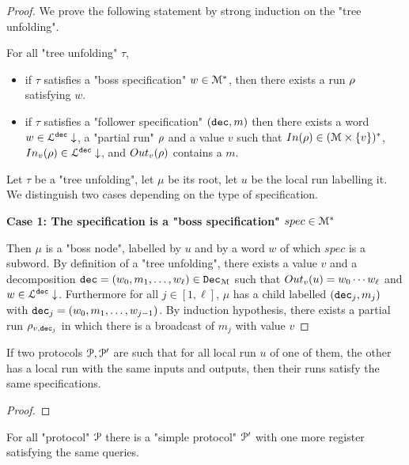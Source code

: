 \begin{proof}
	We prove the following statement by strong induction on the "tree unfolding". 
	
	For all "tree unfolding" $\tau$, 
	
	\begin{itemize}
		\item if $\tau$ satisfies a "boss specification" $w \in \mathcal{M}^*$, then there exists a run $\rho$ satisfying $w$.
		
		\item if $\tau$ satisfies a "follower specification" $(\mathtt{dec}, m)$ then there exists a word $w \in \mathcal{L}^{\mathtt{\mathtt{dec}}}\downarrow$, a "partial run" $\rho$ and a value $v$ such that $In(\rho) \in (\mathcal{M}\times \{v\})^*$, $In_{v}(\rho) \in \mathcal{L}^{\mathtt{\mathtt{dec}}}\downarrow$, and $Out_{v}(\rho)$ contains a $m$.
	\end{itemize}
	
	Let $\tau$ be a "tree unfolding", let $\mu$ be its root, let $u$ be the local run labelling it. 
	We distinguish two cases depending on the type of specification.
	
	\textbf{Case 1: The specification is a "boss specification" $spec \in \mathcal{M}^*$}
	
	Then $\mu$ is a "boss node", labelled by $u$ and by a word $w$ of which $spec$ is a subword. 
	By definition of a "tree unfolding", there exists a value $v$ and a decomposition $\mathtt{dec} = (w_0, m_1, \ldots, w_\ell) \in \mathtt{Dec}_{\mathcal{M}}$ such that $Out_{v}(u) = w_0\cdots w_\ell$ and $w \in \mathcal{L}^{\mathtt{\mathtt{dec}}}\downarrow$.
	Furthermore for all $j \in [1,\ell]$, $\mu$ has a child labelled $(\mathtt{dec}_j, m_j)$ with $\mathtt{dec}_j = (w_0, m_1, \ldots, w_{j-1})$. 	By induction hypothesis, there exists a partial run $\rho_{v, \mathtt{dec}_j}$ in which there is a broadcast of $m_j$ with value $v$ 
\end{proof}

\begin{lemma}
	If two protocols $\mathcal{P}, \mathcal{P}'$ are such that for all local run $u$ of one of them, the other has a local run with the same inputs and outputs, then their runs satisfy the same specifications. 
\end{lemma}

\begin{proof}
\end{proof}



\begin{lemma}
	\label{lem:simple-reduction}
	For all "protocol" $\mathcal{P}$ there is a "simple protocol" $\mathcal{P}'$ with one more register satisfying the same queries.
\end{lemma}


